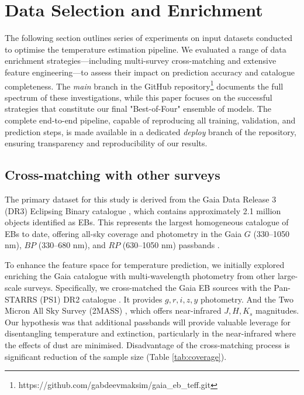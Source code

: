 \documentclass[preprint,12pt,authoryear]{elsarticle}
\begin{document}
\section{Data Selection and Enrichment}
\label{sec:data}

The following section outlines series of experiments on input datasets conducted to optimise the temperature estimation pipeline. 
We evaluated a range of data enrichment strategies---including multi-survey cross-matching and extensive feature engineering---to assess their impact on prediction accuracy and catalogue completeness. 
The \textit{main} branch in the GitHub repository\footnote{https://github.com/gabdeevmaksim/gaia\_eb\_teff.git} documents the full spectrum of these investigations, while this paper focuses on the successful strategies that constitute our final "Best-of-Four" ensemble of models. 
The complete end-to-end pipeline, capable of reproducing all training, validation, and prediction steps, is made available in a dedicated \textit{deploy} branch of the repository, ensuring transparency and reproducibility of our results.

\subsection{Cross-matching with other surveys}
The primary dataset for this study is derived from the Gaia Data Release 3 (DR3) Eclipsing Binary catalogue \citep{GaiaDR3_EB}, which contains approximately 2.1 million objects identified as EBs. 
This represents the largest homogeneous catalogue of EBs to date, offering all-sky coverage and photometry in the Gaia $G$ (330--1050 nm), ${BP}$ (330--680 nm), and ${RP}$ (630--1050 nm) passbands \citep{GaiaDR3_main}.

To enhance the feature space for temperature prediction, we initially explored enriching the Gaia catalogue with multi-wavelength photometry from other large-scale surveys. 
Specifically, we cross-matched the Gaia EB sources with the Pan-STARRS (PS1) DR2 catalogue \citep{Chambers2017,Magnier2025}. 
It provides $g, r, i, z, y$ photometry. And the Two Micron All Sky Survey (2MASS) \citep{Skrutskie2006}, which offers near-infrared $J, H, K_s$ magnitudes. 
Our hypothesis was that additional passbands will provide valuable leverage for disentangling temperature and extinction, particularly in the near-infrared where the effects of dust are minimised. 
Disadvantage of the cross-matching process is significant reduction of the sample size (Table \ref{tab:coverage}). 
\end{document}
